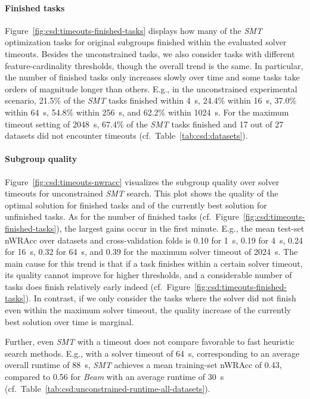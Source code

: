 \documentclass{article}
\theoremstyle{definition}
\begin{document}
\paragraph{Finished tasks}

Figure~\ref{fig:csd:timeouts-finished-tasks} displays how many of the \emph{SMT} optimization tasks for original subgroups finished within the evaluated solver timeouts.
Besides the unconstrained tasks, we also consider tasks with different feature-cardinality thresholds, though the overall trend is the same.
In particular, the number of finished tasks only increases slowly over time and some tasks take orders of magnitude longer than others.
E.g., in the unconstrained experimental scenario, 21.5\% of the \emph{SMT} tasks finished within 4~s, 24.4\% within 16~s, 37.0\% within 64~s, 54.8\% within 256~s, and 62.2\% within 1024~s.
For the maximum timeout setting of 2048~s, 67.4\% of the \emph{SMT} tasks finished and 17 out of 27 datasets did not encounter timeouts (cf.~Table~\ref{tab:csd:datasets}).

\paragraph{Subgroup quality}

Figure~\ref{fig:csd:timeouts-nwracc} visualizes the subgroup quality over solver timeouts for unconstrained \emph{SMT} search.
This plot shows the quality of the optimal solution for finished tasks and of the currently best solution for unfinished tasks.
As for the number of finished tasks (cf.~Figure~\ref{fig:csd:timeouts-finished-tasks}), the largest gains occur in the first minute.
E.g., the mean test-set nWRAcc over datasets and cross-validation folds is 0.10 for 1~s, 0.19 for 4~s, 0.24 for 16~s, 0.32 for 64~s, and 0.39 for the maximum solver timeout of 2024~s.
The main cause for this trend is that if a task finishes within a certain solver timeout, its quality cannot improve for higher thresholds, and a considerable number of tasks does finish relatively early indeed (cf.~Figure~\ref{fig:csd:timeouts-finished-tasks}).
In contrast, if we only consider the tasks where the solver did not finish even within the maximum solver timeout, the quality increase of the currently best solution over time is marginal.

Further, even \emph{SMT} with a timeout does not compare favorable to fast heuristic search methods.
E.g., with a solver timeout of 64~s, corresponding to an average overall runtime of 88~s, \emph{SMT} achieves a mean training-set nWRAcc of 0.43, compared to 0.56 for \emph{Beam} with an average runtime of 30~s (cf.~Table~\ref{tab:csd:unconstrained-runtime-all-datasets}).
\end{document}
